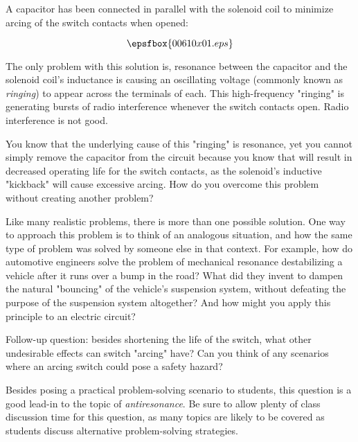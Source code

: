 

A capacitor has been connected in parallel with the solenoid coil to minimize arcing of the switch contacts when opened:

$$\epsfbox{00610x01.eps}$$

The only problem with this solution is, resonance between the capacitor and the solenoid coil's inductance is causing an oscillating voltage (commonly known as {\it ringing}) to appear across the terminals of each.  This high-frequency "ringing" is generating bursts of radio interference whenever the switch contacts open.  Radio interference is not good.

You know that the underlying cause of this "ringing" is resonance, yet you cannot simply remove the capacitor from the circuit because you know that will result in decreased operating life for the switch contacts, as the solenoid's inductive "kickback" will cause excessive arcing.  How do you overcome this problem without creating another problem?







Like many realistic problems, there is more than one possible solution.  One way to approach this problem is to think of an analogous situation, and how the same type of problem was solved by someone else in that context.  For example, how do automotive engineers solve the problem of mechanical resonance destabilizing a vehicle after it runs over a bump in the road?  What did they invent to dampen the natural "bouncing" of the vehicle's suspension system, without defeating the purpose of the suspension system altogether?  And how might you apply this principle to an electric circuit?

\vskip 10pt

Follow-up question: besides shortening the life of the switch, what other undesirable effects can switch "arcing" have?  Can you think of any scenarios where an arcing switch could pose a safety hazard?







Besides posing a practical problem-solving scenario to students, this question is a good lead-in to the topic of {\it antiresonance}.  Be sure to allow plenty of class discussion time for this question, as many topics are likely to be covered as students discuss alternative problem-solving strategies.




